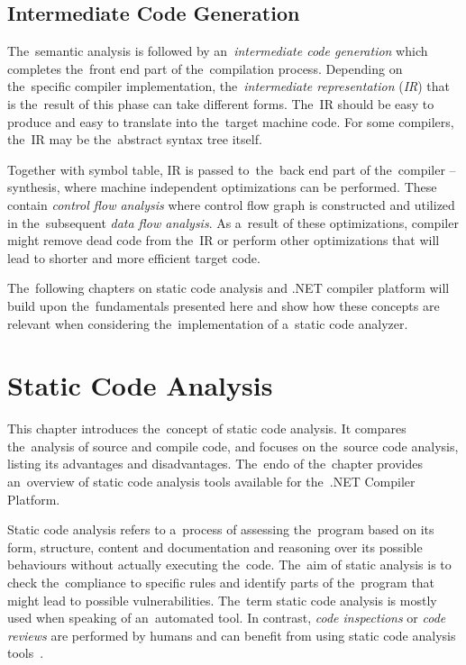 \documentclass[
  digital, %
  table,   %
  lof,     %
  lot,     %
  oneside,
]{fithesis3}
\begin{document}
\section{Intermediate Code Generation}
The~semantic analysis is followed by an~\textit{intermediate code generation} which completes the~front end part of the~compilation process. Depending on the~specific compiler implementation, the~\textit{intermediate representation} (\textit{IR}) that is the~result of this phase can take different forms. The~IR should be easy to produce and easy to translate into the~target machine code. For some compilers, the~IR may be the~abstract syntax tree itself.

Together with symbol table, IR is passed to~the~back end part of the~compiler -- synthesis, where machine independent optimizations can be performed. These contain \textit{control flow analysis} where control flow graph is constructed and utilized in the~subsequent \textit{data flow analysis}. As a~result of these optimizations, compiler might remove dead code from the~IR or perform other optimizations that will lead to shorter and more efficient target code.

\bigskip
The~following chapters on static code analysis and .NET compiler platform will build upon the~fundamentals presented here and show how these concepts are relevant when considering the~implementation of a~static code analyzer.

\chapter{Static Code Analysis}
\label{chap:static-code-analysis}
This chapter introduces the~concept of static code analysis. It compares the~analysis of source and compile code, and focuses on the~source code analysis, listing its advantages and disadvantages. The~endo of the~chapter provides an~overview of static code analysis tools available for the~.NET Compiler Platform.

Static code analysis refers to a~process of assessing the~program based on its form, structure, content and documentation and reasoning over its possible behaviours without actually executing the~code. The~aim of static analysis is to check the~compliance to specific rules and identify parts of the~program that might lead to possible vulnerabilities. The~term static code analysis is mostly used when speaking of an~automated tool. In contrast, \textit{code inspections} or \textit{code reviews} are performed by humans and can benefit from using static code analysis tools~\cite{oswap-sca, sca-ppt}.
\end{document}

